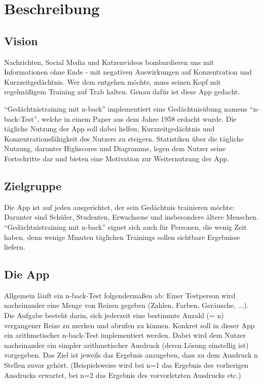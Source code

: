 
\section{Beschreibung}
\subsection{Vision}

Nachrichten, Social Media und Katzenvideos bombardieren uns mit Informationen ohne Ende -
mit negativen Auswirkungen auf Konzentration und Kurzzeitgedächtnis.
Wer dem entgehen möchte, muss seinen Kopf mit regelmäßigem Training auf Trab halten.
Genau dafür ist diese App gedacht.

\enquote{Gedächtnistraining mit n-back} implementiert eine Gedächtnisübung namens
\enquote{n-back-Test}, welche in einem Paper aus dem Jahre 1958 erdacht wurde.
Die tägliche Nutzung der App soll dabei helfen, Kurzzeitgedächtnis und
Konzentrationsfähigkeit des Nutzers zu steigern. Statistiken über die tägliche Nutzung,
darunter Highscores und Diagramme, legen dem Nutzer seine Fortschritte dar und bieten
eine Motivation zur Weiternutzung der App.

\subsection{Zielgruppe}

Die App ist auf jeden ausgerichtet, der sein Gedächtnis trainieren möchte:
Darunter sind Schüler, Studenten, Erwachsene und insbesondere ältere Menschen.
\enquote{Gedächtnis\-training mit n-back} eignet sich auch für Personen, die wenig Zeit haben,
denn wenige Minuten täglichen Trainings sollen sichtbare Ergebnisse liefern.

\subsection{Die App}

Allgemein läuft ein n-back-Test folgendermaßen ab:
Einer Testperson wird nacheinander eine Menge von Reizen gegeben (Zahlen, Farben, Geräusche, ...).
Die Aufgabe besteht darin, sich jederzeit eine bestimmte Anzahl (= n) vergangener Reize zu merken
und abrufen zu können.
Konkret soll in dieser App ein arithmetischer n-back-Test implementiert werden.
Dabei wird dem Nutzer nacheinander ein simpler arithmetischer Ausdruck (deren Lösung einstellig ist) vorgegeben.
Das Ziel ist jeweils das Ergebnis anzugeben, dass zu dem Ausdruck n Stellen zuvor gehört.
(Beispielsweise wird bei n=1 das Ergebnis des vorherigen Ausdrucks erwartet, bei n=2 das Ergebnis des vorvorletzten Ausdrucks etc.)


